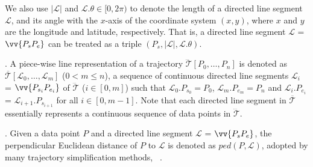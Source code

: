 We also use $|\mathcal{L}|$ and $\mathcal{L}.\theta\in [0, 2\pi)$ to denote the length of a directed line segment $\mathcal{L}$, and its angle with the $x$-axis of the coordinate system $(x, y)$, where $x$ and $y$ are the longitude and latitude, respectively.
That is, a directed line segment $\mathcal{L}$ = $\vv{P_{s}P_{e}}$ can be treated as a triple $(P_s, |\mathcal{L}|, \mathcal{L}.\theta)$.

. A piece-wise line representation of a trajectory $\dddot{\mathcal{T}}[P_0, \ldots, P_n]$ is denoted as $\overline{\mathcal{T}}[\mathcal{L}_0, \ldots , \mathcal{L}_m]$ ($0< m \le n$), a sequence of continuous directed line segments $\mathcal{L}_{i}$ = $\vv{P_{s_i}P_{e_i}}$ of $\dddot{\mathcal{T}}$ ($i\in[0,m]$)  such that $\mathcal{L}_{0}.P_{s_0} = P_0$, $\mathcal{L}_{m}.P_{e_m} = P_n$ and  $\mathcal{L}_{i}.P_{e_i}$ = $\mathcal{L}_{i+1}.P_{s_{i+1}}$ for all $i\in[0, m-1]$. Note that each directed line segment in $\overline{\mathcal{T}}$ essentially represents a continuous sequence of data points in $\dddot{\mathcal{T}}$.



. Given a data point $P$ and a directed line segment $\mathcal{L}$ = $\vv{P_{s}P_{e}}$, the perpendicular Euclidean distance of $P$ to $\mathcal{L}$ is denoted as $ped(P, \mathcal{L})$, adopted by many trajectory simplification methods, \eg~\cite{Douglas:Peucker, Hershberger:Speeding, Liu:BQS, Williams:Longest, Sklansky:Cone, Dunham:Cone, Zhao:Sleeve, Lin:Operb}.


